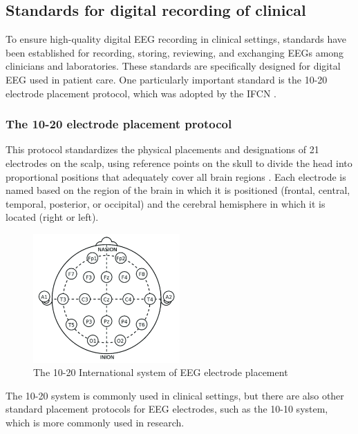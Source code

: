 \subsection{Standards for digital recording of clinical }
To ensure high-quality digital \gls{EEG} recording in clinical settings, standards have been established for recording, storing, reviewing, and exchanging \glspl{EEG} among clinicians and laboratories. These standards are specifically designed for digital \gls{EEG} used in patient care. One particularly important standard is the 10-20 electrode placement protocol, which was adopted by the \gls{IFCN} \cite{nuwer_ifcn_1998}.

\subsubsection{The 10-20 electrode placement protocol}
This protocol standardizes the physical placements and designations of 21 electrodes on the scalp, using reference points on the skull to divide the head into proportional positions that adequately cover all brain regions \cite{rojas_study_2018}. Each electrode is named based on the region of the brain in which it is positioned (frontal, central, temporal, posterior, or occipital) and the cerebral hemisphere in which it is located (right or left).

\begin{figure}[ht]
    \centering
    \includegraphics[width=0.5\textwidth]{images/Th-background/10-20-electrode-placement.png}
    \caption{The 10-20 International system of EEG electrode placement \cite{rojas_study_2018}}
    \label{fig:10-20-electrode-placement}
\end{figure}

The 10-20 system is commonly used in clinical settings, but there are also other standard placement protocols for EEG electrodes, such as the 10-10 system, which is more commonly used in research.

